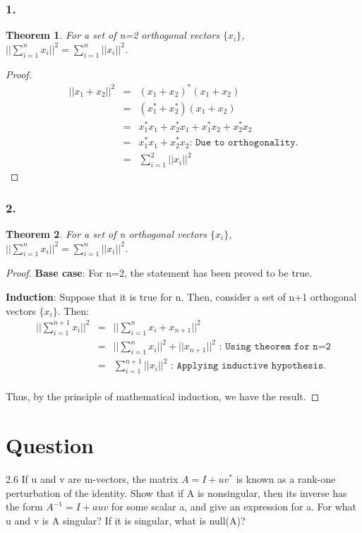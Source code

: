 \documentclass[10pt]{amsart}
\newtheorem{thm}{Theorem}[subsection]
\theoremstyle{remark}
\begin{document}
\subsubsection{1.}
\begin{thm}
For a set of n=2 orthogonal vectors $\{x_{i}\}$, \\
$||\sum_{i=1}^{n} x_{i}||^{2} = \sum_{i=1}^{n}|| x_{i}||^{2}$.
\end{thm}
\begin{proof}
\begin{eqnarray}
||x_{1}+x_{2}||^{2} &=& (x_{1}+x_{2})^{*}(x_{1}+x_{2})\\
&=& (x_{1}^{*}+x_{2}^{*})(x_{1}+x_{2})\\
&=& x_{1}^{*}x_{1}+x_{2}^{*}x_{1} + x_{1}^{*}x_{2}+x_{2}^{*}x_{2}\\
&=& x_{1}^{*}x_{1} +x_{2}^{*}x_{2} \texttt{: Due to orthogonality.}\\
&=& \sum_{i=1}^{2}||x_{i}||^{2}
\end{eqnarray} 
\end{proof}

\subsubsection{2.}
\begin{thm}
For a set of n orthogonal vectors $\{x_{i}\}$, \\
$||\sum_{i=1}^{n} x_{i}||^{2} = \sum_{i=1}^{n}|| x_{i}||^{2}$.
\end{thm}
\begin{proof}
\textbf{Base case}: For n=2, the statement has been proved to be true.

\textbf{Induction}: Suppose that it is true for n. Then, consider a set of n+1 orthogonal vectors $\{x_{i}\}$. Then:
\begin{eqnarray}
||\sum_{i=1}^{n+1} x_{i}||^{2} &=& ||\sum_{i=1}^{n} x_{i} + x_{n+1}||^{2} \\
&=& || \sum_{i=1}^{n} x_{i}||^{2} + ||x_{n+1}||^{2} \texttt{ : Using theorem for n=2}\\
&=& \sum_{i=1}^{n+1} || x_{i}||^{2} \texttt{ : Applying inductive hypothesis.}\\
\end{eqnarray}

Thus, by the principle of mathematical induction, we have the result.
\end{proof}

\section{Question}
2.6 If u and v are m-vectors, the matrix $A=I+uv^{*}$ is known as a rank-one perturbation of the identity. Show that if A is nonsingular, then its inverse has the form $A^{-1} = I + auv$ for some scalar a, and give an expression for a. For what u and v is A singular? If it is singular, what is null(A)?
\end{document}
